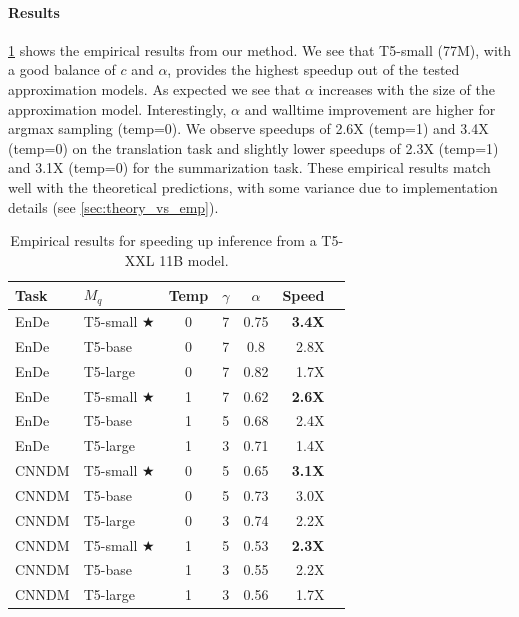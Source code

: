 \documentclass[nohyperref]{article}
\theoremstyle{plain}
\theoremstyle{definition}
\theoremstyle{remark}
\begin{document}
\paragraph{Results}

\cref{tbl:t5 model results} shows the empirical results from our method. We see that T5-small (77M), with a good balance of $c$ and $\alpha$, provides the highest speedup out of the tested approximation models. As expected we see that $\alpha$ increases with the size of the approximation model. Interestingly, $\alpha$ and walltime improvement are higher for argmax sampling (temp=0). We observe speedups of 2.6X (temp=1) and 3.4X (temp=0) on the translation task and slightly lower speedups of 2.3X (temp=1) and 3.1X (temp=0) for the summarization task. These empirical results match well with the theoretical predictions, with some variance due to implementation details (see \cref{sec:theory_vs_emp}).

\begin{table}[ht]
  \caption{Empirical results for speeding up inference from a T5-XXL 11B model.}
  \label{tbl:t5 model results}
\vskip 0.15in
\begin{center}
\begin{small}
\begin{sc}
\begin{tabular}{llcccrr}
\toprule
Task & $M_q$ & Temp & $\gamma$ & $\alpha$ & Speed\\
\midrule
EnDe & T5-small $\bigstar$     & 0 & 7 &  0.75  &  \textbf{3.4X}\\
EnDe & T5-base      & 0 & 7 &  0.8  &  2.8X \\
EnDe & T5-large      & 0 & 7 &  0.82  &  1.7X\\
EnDe & T5-small $\bigstar$     & 1 & 7 &  0.62  &  \textbf{2.6X}\\
EnDe & T5-base      & 1 & 5 &  0.68  &  2.4X \\
EnDe & T5-large      & 1 & 3 &  0.71  &  1.4X \\
\midrule
CNNDM & T5-small $\bigstar$      & 0 & 5 &  0.65  &  \textbf{3.1X} \\
CNNDM & T5-base      & 0 & 5 &  0.73  &  3.0X \\
CNNDM & T5-large      & 0 & 3 &  0.74  &  2.2X\\
CNNDM & T5-small $\bigstar$      & 1 & 5 &  0.53  &  \textbf{2.3X}\\
CNNDM & T5-base      & 1 & 3 &  0.55  &  2.2X \\
CNNDM & T5-large      & 1 & 3 &  0.56  &  1.7X \\
\bottomrule
\end{tabular}
\end{sc}
\end{small}
\end{center}
\vskip -0.1in
\end{table}
\end{document}
